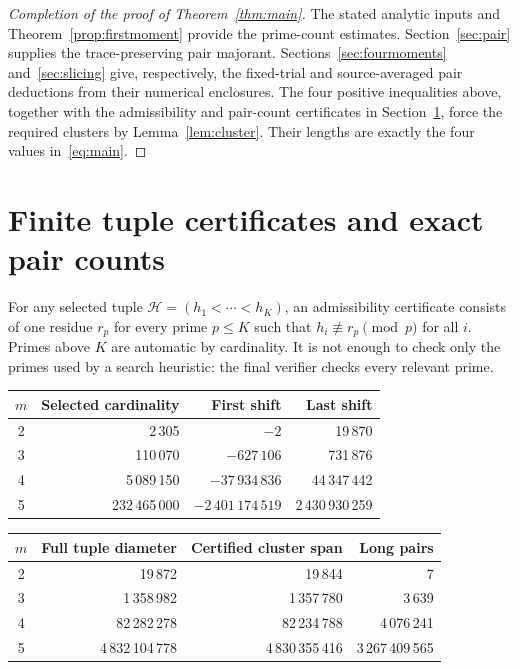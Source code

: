 \documentclass[11pt,a4paper]{article}
\theoremstyle{definition}\newtheorem{definition}[theorem]{Definition}
\theoremstyle{remark}\newtheorem{remark}[theorem]{Remark}
\newcommand{\smalltable}{\small\setlength{\tabcolsep}{5pt}}
\numberwithin{equation}{section}
\begin{document}
\begin{proof}[Completion of the proof of Theorem~\ref{thm:main}]
The stated analytic inputs and Theorem~\ref{prop:firstmoment} provide the prime-count estimates. Section~\ref{sec:pair} supplies the trace-preserving pair majorant. Sections~\ref{sec:fourmoments} and~\ref{sec:slicing} give, respectively, the fixed-trial and source-averaged pair deductions from their numerical enclosures. The four positive inequalities above, together with the admissibility and pair-count certificates in Section~\ref{sec:finite}, force the required clusters by Lemma~\ref{lem:cluster}. Their lengths are exactly the four values in~\eqref{eq:main}.
\end{proof}

\section{Finite tuple certificates and exact pair counts}\label{sec:finite}
For any selected tuple $\mathcal H=(h_1<\cdots<h_K)$, an admissibility certificate consists of one residue $r_p$ for every prime $p\le K$ such that $h_i\not\equiv r_p\pmod p$ for all $i$. Primes above $K$ are automatic by cardinality. It is not enough to check only the primes used by a search heuristic: the final verifier checks every relevant prime.

\begin{center}\smalltable
\begin{tabular}{@{}crrr@{}}\toprule
$m$&Selected cardinality&First shift&Last shift\\\midrule
2&2\,305&$-2$&19\,870\\
3&110\,070&$-627\,106$&731\,876\\
4&5\,089\,150&$-37\,934\,836$&44\,347\,442\\
5&232\,465\,000&$-2\,401\,174\,519$&2\,430\,930\,259\\\bottomrule
\end{tabular}\end{center}
\begin{center}\smalltable
\begin{tabular}{@{}crrr@{}}\toprule
$m$&Full tuple diameter&Certified cluster span&Long pairs\\\midrule
2&19\,872&19\,844&7\\
3&1\,358\,982&1\,357\,780&3\,639\\
4&82\,282\,278&82\,234\,788&4\,076\,241\\
5&4\,832\,104\,778&4\,830\,355\,416&3\,267\,409\,565\\\bottomrule
\end{tabular}\end{center}
\end{document}

